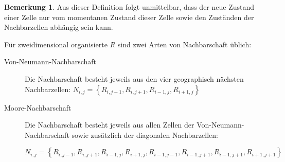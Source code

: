 \documentclass[11pt]{scrreprt} %
\theoremstyle{definition}
\newtheorem*{bemerkung}{Bemerkung}
\begin{document}
\begin{bemerkung}
Aus dieser Definition folgt unmittelbar, dass der neue Zustand einer Zelle nur vom momentanen Zustand dieser Zelle sowie den Zuständen der Nachbarzellen abhängig sein kann.
\end{bemerkung}

Für zweidimensional organisierte $R$ sind zwei Arten von Nachbarschaft üblich:
\begin{description}
\item[Von-Neumann-Nachbarschaft] Die Nachbarschaft besteht jeweils aus den vier geographisch nächsten Nachbarzellen: $N_{i,j} = \left\{ R_{i,j-1}, R_{i,j+1}, R_{i-1,j}, R_{i+1,j}\right\}$
\item[Moore-Nachbarschaft] Die Nachbarschaft besteht jeweils aus allen Zellen der Von-Neumann-Nachbarschaft sowie zusätzlich der diagonalen Nachbarzellen:

$N_{i,j} = \left\{ R_{i,j-1}, R_{i,j+1}, R_{i-1,j}, R_{i+1,j},R_{i-1,j-1}, R_{i-1,j+1}, R_{i-1,j+1}, R_{i+1,j+1} \right\}$ \cite{schurr}
\end{description}
\end{document}
